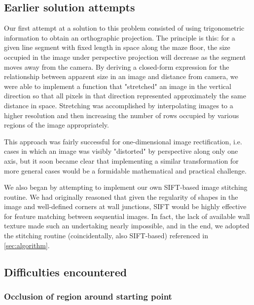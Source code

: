 \documentclass[10pt,twocolumn,letterpaper]{article}
\begin{document}
\subsection{Earlier solution attempts}
\label{sub:earlierattempts}

Our first attempt at a solution to this problem consisted of using trigonometric information to obtain an orthographic
projection.  The principle is this: for a given line segment with fixed length in space along the maze floor, the size
occupied in the image under perspective projection will decrease as the segment moves away from the camera.  By deriving
a closed-form expression for the relationship between apparent size in an image and distance from camera, we were able
to implement a function that "stretched" an image in the vertical direction so that all pixels in that direction
represented approximately the same distance in space.  Stretching was accomplished by interpolating images to a higher
resolution and then increasing the number of rows occupied by various regions of the image appropriately.

This approach was fairly successful for one-dimensional image rectification, i.e. cases in which an image was visibly
"distorted" by perspective along only one axis, but it soon became clear that implementing a similar transformation for
more general cases would be a formidable mathematical and practical challenge.

We also began by attempting to implement our own SIFT-based image stitching routine.  We had originally reasoned that
given the regularity of shapes in the image and well-defined corners at wall junctions, SIFT would be highly effective
for feature matching between sequential images.  In fact, the lack of available wall texture made such an undertaking
nearly impossible, and in the end, we adopted the stitching routine (coincidentally, also SIFT-based) referenced in
\textsection\ref{sec:algorithm}.

\subsection{Difficulties encountered}
\label{sub:difficulties}

\subsubsection{Occlusion of region around starting point} %
\label{ssub:occlusion_of_region_around_starting_point}
\end{document}

